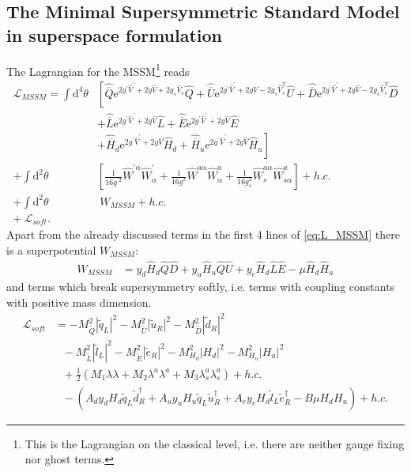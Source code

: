 \subsection{The Minimal Supersymmetric Standard Model in superspace formulation}
The Lagrangian for the MSSM\footnote{This is the Lagrangian on the classical level, i.e. there are neither gauge fixing nor ghost terms.} reads
\begin{align}
\mathcal{L}_{MSSM} = \int \mathrm{d}^4 \theta & \left[ \hat{\overline{Q}}\mathrm{e}^{2g^\prime \hat{V}^\prime + 2g\hat{V} + 2g_s\hat{V}_s}\hat{Q} + \hat{\overline{U}}\mathrm{e}^{2g^\prime \hat{V}^\prime + 2g\hat{V} - 2g_s\hat{V}^T_s}\hat{U} + \hat{\overline{D}}\mathrm{e}^{2g^\prime \hat{V}^\prime + 2g\hat{V} - 2g_s\hat{V}^T_s}\hat{D} \right.\nonumber\\
 & + \hat{\overline{L}}\mathrm{e}^{2g^\prime \hat{V}^\prime + 2g\hat{V}}\hat{L} + \hat{\overline{E}}\mathrm{e}^{2g^\prime \hat{V}^\prime + 2g\hat{V}}\hat{E}\nonumber\\
 & + \left. \hat{\overline{H}}_d\mathrm{e}^{2g^\prime \hat{V}^\prime + 2g\hat{V}}\hat{H}_d + \hat{\overline{H}}_u\mathrm{e}^{2g^\prime \hat{V}^\prime + 2g\hat{V}}\hat{H}_u \right]\nonumber\\
 + \int \mathrm{d}^2\theta & \left[ \frac{1}{16g^{\prime 2}} \hat{W}^{\prime\alpha}\hat{W}^\prime_\alpha + \frac{1}{16g^{2}} \hat{W}^{a\alpha}\hat{W}^a_\alpha + \frac{1}{16g_s^2} \hat{W}_s^{a\alpha}\hat{W}^a_{s\alpha} \right] + h.c.\nonumber\\
 + \int \mathrm{d}^2\theta&\ W_{MSSM} + h.c.\nonumber\\
 +\  \mathcal{L}_{soft}.\ &\label{eq:L_MSSM}
\end{align}
Apart from the already discussed terms in the first 4 lines of \ref{eq:L_MSSM} there is a superpotential $W_{MSSM}$:
\begin{align}
W_{MSSM} &= y_d \hat{H}_d \hat{Q} \hat{D} + y_u \hat{H}_u \hat{Q} \hat U + y_e \hat{H}_d \hat{L} \hat{E} - \mu \hat{H}_d \hat{H}_u\label{eq:W_MSSM}
\end{align}
and terms which break supersymmetry softly, i.e. terms with coupling constants with positive mass dimension.
\begin{align}
\mathcal{L}_{soft} &= -M^2_{\tilde{Q}}|\tilde{q}_L|^2 - M^2_{\tilde{U}}|\tilde{u}_R|^2 - M^2_{\tilde{D}}|\tilde{d}_R|^2 \nonumber\\
&\ \ \ - M^2_{\tilde{L}}|\tilde{l}_L|^2 - M^2_{\tilde{E}}|\tilde{e}_R|^2 - M^2_{H_d}|H_d|^2 - M^2_{H_u}|H_u|^2\nonumber\\
&\ \ \ +\frac{1}{2}\left( M_1 \lambda\lambda + M_2 \lambda^a\lambda^a + M_3 \lambda_s^a\lambda_s^a\right) + h.c.\nonumber\\
&\ \ \ -\left( A_d y_d H_d \tilde{q}_L \tilde{d}^\dagger_R + A_u y_u H_u \tilde{q}_L \tilde{u}^\dagger_R + A_e y_e H_d \tilde{l}_L \tilde{e}^\dagger_R -B\mu H_d H_u \right) + h.c.\label{eq:L_soft}
\end{align}
